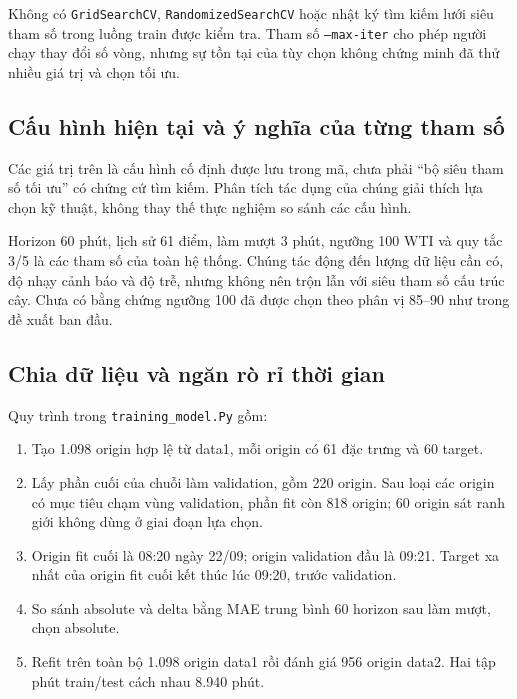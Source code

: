     Không có \texttt{GridSearchCV}, \texttt{RandomizedSearchCV} hoặc nhật ký tìm kiếm lưới siêu tham số trong luồng train được kiểm tra. Tham số \texttt{--max-iter} cho phép người chạy thay đổi số vòng, nhưng sự tồn tại của tùy chọn không chứng minh đã thử nhiều giá trị và chọn tối ưu.

    \subsection{Cấu hình hiện tại và ý nghĩa của từng tham số}

    

    Các giá trị trên là cấu hình cố định được lưu trong mã, chưa phải ``bộ siêu tham số tối ưu'' có chứng cứ tìm kiếm. Phân tích tác dụng của chúng giải thích lựa chọn kỹ thuật, không thay thế thực nghiệm so sánh các cấu hình.

    Horizon 60 phút, lịch sử 61 điểm, làm mượt 3 phút, ngưỡng 100 WTI và quy tắc 3/5 là các tham số của toàn hệ thống. Chúng tác động đến lượng dữ liệu cần có, độ nhạy cảnh báo và độ trễ, nhưng không nên trộn lẫn với siêu tham số cấu trúc cây. Chưa có bằng chứng ngưỡng 100 đã được chọn theo phân vị 85--90 như trong đề xuất ban đầu.

    \subsection{Chia dữ liệu và ngăn rò rỉ thời gian}
    Quy trình trong \texttt{training\_model.Py} gồm:
    \begin{enumerate}
        \item Tạo 1.098 origin hợp lệ từ data1, mỗi origin có 61 đặc trưng và 60 target.
        \item Lấy phần cuối của chuỗi làm validation, gồm 220 origin. Sau loại các origin có mục tiêu chạm vùng validation, phần fit còn 818 origin; 60 origin sát ranh giới không dùng ở giai đoạn lựa chọn.
        \item Origin fit cuối là 08:20 ngày 22/09; origin validation đầu là 09:21. Target xa nhất của origin fit cuối kết thúc lúc 09:20, trước validation.
        \item So sánh absolute và delta bằng MAE trung bình 60 horizon sau làm mượt, chọn absolute.
        \item Refit trên toàn bộ 1.098 origin data1 rồi đánh giá 956 origin data2. Hai tập phút train/test cách nhau 8.940 phút.
    \end{enumerate}

